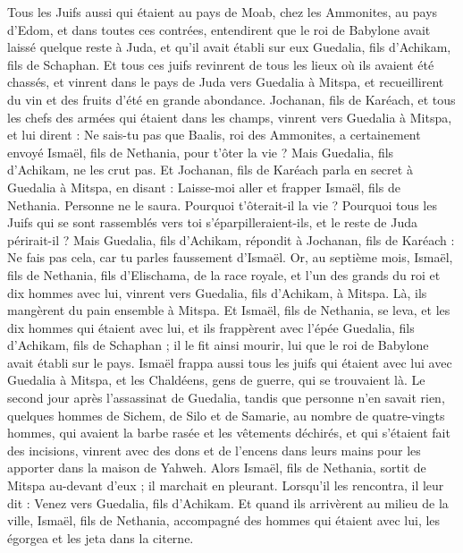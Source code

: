 \begin{multicols}{2}
Tous les Juifs aussi qui étaient au pays de Moab, chez les Ammonites, au pays d'Edom, et dans toutes ces contrées, entendirent que le roi de Babylone avait laissé quelque reste à Juda, et qu'il avait établi sur eux Guedalia, fils d'Achikam, fils de Schaphan.
Et tous ces juifs revinrent de tous les lieux où ils avaient été chassés, et vinrent dans le pays de Juda vers Guedalia à Mitspa, et recueillirent du vin et des fruits d'été en grande abondance.
Jochanan, fils de Karéach, et tous les chefs des armées qui étaient dans les champs, vinrent vers Guedalia à Mitspa,
et lui dirent : Ne sais-tu pas que Baalis, roi des Ammonites, a certainement envoyé Ismaël, fils de Nethania, pour t'ôter la vie ? Mais Guedalia, fils d'Achikam, ne les crut pas.
Et Jochanan, fils de Karéach parla en secret à Guedalia à Mitspa, en disant : Laisse-moi aller et frapper Ismaël, fils de Nethania. Personne ne le saura. Pourquoi t'ôterait-il la vie ? Pourquoi tous les Juifs qui se sont rassemblés vers toi s'éparpilleraient-ils, et le reste de Juda périrait-il ?
Mais Guedalia, fils d'Achikam, répondit à Jochanan, fils de Karéach : Ne fais pas cela, car tu parles faussement d'Ismaël.
\VerseOne{}Or, au septième mois, Ismaël, fils de Nethania, fils d'Elischama, de la race royale, et l'un des grands du roi et dix hommes avec lui, vinrent vers Guedalia, fils d'Achikam, à Mitspa. Là, ils mangèrent du pain ensemble à Mitspa.
Et Ismaël, fils de Nethania, se leva, et les dix hommes qui étaient avec lui, et ils frappèrent avec l'épée Guedalia, fils d'Achikam, fils de Schaphan ; il le fit ainsi mourir, lui que le roi de Babylone avait établi sur le pays.
Ismaël frappa aussi tous les juifs qui étaient avec lui avec Guedalia à Mitspa, et les Chaldéens, gens de guerre, qui se trouvaient là.
Le second jour après l'assassinat de Guedalia, tandis que personne n'en savait rien,
quelques hommes de Sichem, de Silo et de Samarie, au nombre de quatre-vingts hommes, qui avaient la barbe rasée et les vêtements déchirés, et qui s'étaient fait des incisions, vinrent avec des dons et de l'encens dans leurs mains pour les apporter dans la maison de Yahweh.
Alors Ismaël, fils de Nethania, sortit de Mitspa au-devant d'eux ; il marchait en pleurant. Lorsqu'il les rencontra, il leur dit : Venez vers Guedalia, fils d'Achikam.
Et quand ils arrivèrent au milieu de la ville, Ismaël, fils de Nethania, accompagné des hommes qui étaient avec lui, les égorgea et les jeta dans la citerne.

\end{multicols}
